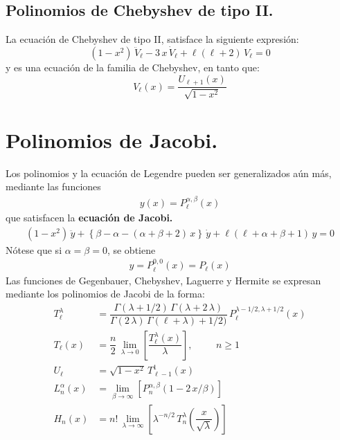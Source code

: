 \subsection{Polinomios de Chebyshev de tipo II.}
La ecuación de Chebyshev de tipo II, satisface la siguiente expresión:
\begin{equation}
(1 - x^{2}) \, \ddot{V}_{\ell} - 3 \, x \, \dot{V}_{\ell} + \ell (\ell + 2) \, V_{\ell} = 0
\label{eq:ecuacion_08_89}
\end{equation}
y es una ecuación de la familia de Chebyshev, en tanto que:
\begin{equation}
V_{\ell} (x) = \dfrac{U_{\ell+1}(x)}{\sqrt{1 - x^{2}}}
\label{eq:ecuacion_08_90}
\end{equation}
\section{Polinomios de Jacobi.}
Los polinomios y la ecuación de Legendre pueden ser generalizados aún más, mediante las funciones
\begin{align*}
y(x) = P_{\ell}^{\alpha, \beta} (x)
\end{align*}
que satisfacen la \textbf{ecuación de Jacobi.}
\begin{align*}
(1 - x^{2}) \, \ddot{y} + \left\{ \beta - \alpha - (\alpha + \beta + 2) \, x \right\} \, \dot{y} + \ell (\ell + \alpha + \beta + 1) \, y = 0
\end{align*}
Nótese que si $\alpha = \beta = 0$, se obtiene
\begin{align*}
y = P_{\ell}^{0,0} (x) = P_{\ell}(x)
\end{align*}
Las funciones de Gegenbauer, Chebyshev, Laguerre y Hermite se expresan mediante los polinomios de Jacobi de la forma:
\begin{align*}
T_{\ell}^{\lambda} &= \dfrac{\Gamma (\lambda + 1/2) \, \Gamma (\lambda + 2 \, \lambda)}{\Gamma (2 \, \lambda) \, \Gamma (\ell + \lambda) + 1/2)} \, P_{\ell}^{\lambda-1/2, \lambda+1/2} (x) \\[1em]
T_{\ell}(x) &= \dfrac{n}{2} \, \lim_{\lambda \to 0} \left[ \dfrac{T_{\ell}^{\lambda}(x)}{\lambda} \right], \hspace{1cm} n \geq 1 \\[1em]
U_{\ell} &= \sqrt{1 - x^{2}} \, T_{\ell-1}^{1} (x) \\[1em]
L_{n}^{\alpha} (x) &= \lim_{\beta \to \infty} \left[ P_{n}^{\alpha, \beta} (1 - 2 \, x / \beta) \right] \\[1em]
H_{n}(x) &= n! \, \lim_{\lambda \to \infty} \left[ \lambda^{-n/2} \, T_{n}^{\lambda} \left( \dfrac{x}{\sqrt{\lambda}} \right) \right]
\end{align*}
